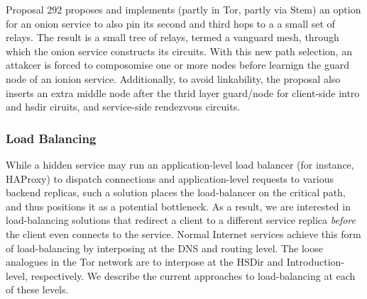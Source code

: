 Proposal 292 proposes and implements (partly in Tor, partly via Stem) an option
for an onion service to also pin its second and third hops to a a small set of 
relays.
%
The result is a small tree of relays, termed a vanguard mesh, through which the
onion service constructs its circuits.
%
With this new path selection, an attakcer is forced to composomise one or more
nodes before learnign the guard node of an ionion service.
%
Additionally, to avoid linkability, the proposal also inserts an extra middle
node after the thrid layer guard/node for client-side intro and hsdir ciruits,
and service-side rendezvous circuits.

%
%


\subsubsection{Load Balancing}
%
%
%

While a hidden service may run an application-level load balancer (for
instance, HAProxy) to dispatch connections and application-level
requests to various backend replicas,  such a solution places the load-balancer
on the critical path, and thus positions it as a potential bottleneck.  
%
As a result, we are interested in load-balancing solutions that redirect a
client to a different service replica \emph{before} the client even connects to
the service.
%
Normal Internet services achieve this form of load-balancing by interposing
at the DNS and routing level.
%
The loose analogues in the Tor network are to interpose at the HSDir and
Introduction-level, respectively. 
%
We describe the current approaches to load-balancing at each of these levels.


